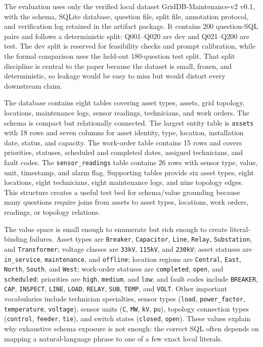 \documentclass[cmc,article,submit,moreauthors,pdftex]{Definitions/tsp}
\begin{document}
The evaluation uses only the verified local dataset GridDB-Maintenance-v2 v0.1, with the schema, SQLite database, question file, split file, annotation protocol, and verification log retained in the artifact package. It contains 200 question-SQL pairs and follows a deterministic split: Q001--Q020 are dev and Q021--Q200 are test. The dev split is reserved for feasibility checks and prompt calibration, while the formal comparison uses the held-out 180-question test split. That split discipline is central to the paper because the dataset is small, frozen, and deterministic, so leakage would be easy to miss but would distort every downstream claim.

The database contains eight tables covering asset types, assets, grid topology, locations, maintenance logs, sensor readings, technicians, and work orders. The schema is compact but relationally connected. The largest entity table is \texttt{assets} with 18 rows and seven columns for asset identity, type, location, installation date, status, and capacity. The work-order table contains 15 rows and covers priorities, statuses, scheduled and completed dates, assigned technicians, and fault codes. The \texttt{sensor\_readings} table contains 26 rows with sensor type, value, unit, timestamp, and alarm flag. Supporting tables provide six asset types, eight locations, eight technicians, eight maintenance logs, and nine topology edges. This structure creates a useful test bed for schema/value grounding because many questions require joins from assets to asset types, locations, work orders, readings, or topology relations.

The value space is small enough to enumerate but rich enough to create literal-binding failures. Asset types are \texttt{Breaker}, \texttt{Capacitor}, \texttt{Line}, \texttt{Relay}, \texttt{Substation}, and \texttt{Transformer}; voltage classes are \texttt{33kV}, \texttt{115kV}, and \texttt{230kV}; asset statuses are \texttt{in\_service}, \texttt{maintenance}, and \texttt{offline}; location regions are \texttt{Central}, \texttt{East}, \texttt{North}, \texttt{South}, and \texttt{West}; work-order statuses are \texttt{completed}, \texttt{open}, and \texttt{scheduled}; priorities are \texttt{high}, \texttt{medium}, and \texttt{low}; and fault codes include \texttt{BREAKER}, \texttt{CAP}, \texttt{INSPECT}, \texttt{LINE}, \texttt{LOAD}, \texttt{RELAY}, \texttt{SUB}, \texttt{TEMP}, and \texttt{VOLT}. Other important vocabularies include technician specialties, sensor types (\texttt{load}, \texttt{power\_factor}, \texttt{temperature}, \texttt{voltage}), sensor units (\texttt{C}, \texttt{MW}, \texttt{kV}, \texttt{pu}), topology connection types (\texttt{control}, \texttt{feeder}, \texttt{tie}), and switch states (\texttt{closed}, \texttt{open}). These values explain why exhaustive schema exposure is not enough: the correct SQL often depends on mapping a natural-language phrase to one of a few exact local literals.
\end{document}
